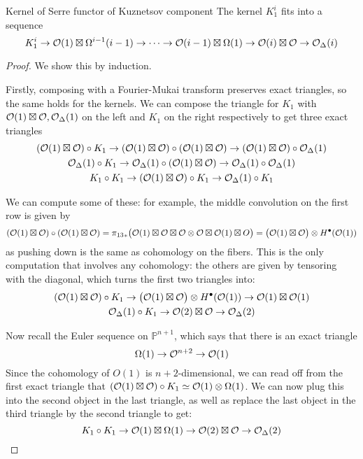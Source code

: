 \begin{proposition}{Kernel of Serre functor of Kuznetsov component}{}   
The kernel $K_1^i$ fits into a sequence $$K_1^i\rightarrow \mathcal{O}(1)\boxtimes \Omega^{i-1}(i-1)\rightarrow \dots \rightarrow \mathcal{O}(i-1)\boxtimes \Omega(1)\rightarrow \mathcal{O}(i)\boxtimes \mathcal{O} \rightarrow \mathcal{O}_\Delta(i)$$
\end{proposition}
\begin{proof}
    We show this by induction.
    
    Firstly, composing with a Fourier-Mukai transform preserves exact triangles, so the same holds for the kernels. We can compose the triangle for $K_1$ with $\mathcal{O}(1)\boxtimes \mathcal{O}, \mathcal{O}_\Delta(1)$ on the left and $K_1$ on the right respectively to get three exact triangles \begin{gather*}
        (\mathcal{O}(1)\boxtimes \mathcal{O}) \circ K_1 \rightarrow (\mathcal{O}(1)\boxtimes \mathcal{O})  \circ (\mathcal{O}(1)\boxtimes \mathcal{O}) \rightarrow (\mathcal{O}(1)\boxtimes \mathcal{O}) \circ \mathcal{O}_\Delta(1)\\
        \mathcal{O}_\Delta(1)\circ K_1 \rightarrow \mathcal{O}_\Delta(1) \circ (\mathcal{O}(1)\boxtimes \mathcal{O})  \rightarrow \mathcal{O}_\Delta(1) \circ \mathcal{O}_\Delta(1)\\
        K_1 \circ K_1  \rightarrow (\mathcal{O}(1)\boxtimes \mathcal{O})\circ K_1 \rightarrow \mathcal{O}_\Delta(1)\circ K_1
    \end{gather*}
    
    We can compute some of these: for example, the middle convolution on the first row is given by $$(\mathcal{O}(1)\boxtimes \mathcal{O})  \circ (\mathcal{O}(1)\boxtimes \mathcal{O}) ={\pi_{13}}_*\big(\mathcal{O}(1)\boxtimes \mathcal{O} \boxtimes \mathcal{O} \otimes \mathcal{O} \boxtimes \mathcal{O}(1) \boxtimes O\big)=\big(\mathcal{O}(1)\boxtimes \mathcal{O}\big) \otimes H^\bullet(\mathcal{O}(1))$$
    as pushing down is the same as cohomology on the fibers. This is the only computation that involves any cohomology: the others are given by tensoring with the diagonal, which turns the first two triangles into: \begin{gather*}
        (\mathcal{O}(1)\boxtimes \mathcal{O}) \circ K_1 \rightarrow \big(\mathcal{O}(1)\boxtimes \mathcal{O}\big) \otimes H^\bullet(\mathcal{O}(1)) \rightarrow \mathcal{O}(1)\boxtimes \mathcal{O}(1)\\
        \mathcal{O}_\Delta(1)\circ K_1 \rightarrow \mathcal{O}(2)\boxtimes \mathcal{O} \rightarrow \mathcal{O}_\Delta(2)
    \end{gather*}
    
    Now recall the Euler sequence on $\mathbb{P}^{n+1}$, which says that there is an exact triangle $$\Omega(1)\rightarrow \mathcal{O}^{n+2}\rightarrow \mathcal{O}(1)$$
    Since the cohomology of $O(1)$ is $n+2$-dimensional, we can read off from the first exact triangle that $ (\mathcal{O}(1)\boxtimes \mathcal{O}) \circ K_1\simeq \mathcal{O}(1) \otimes \Omega(1)$. We can now plug this into the second object in the last triangle, as well as replace the last object in the third triangle by the second triangle to get: $$K_1 \circ K_1 \rightarrow \mathcal{O}(1)\boxtimes \Omega(1)\rightarrow \mathcal{O}(2)\boxtimes \mathcal{O} \rightarrow \mathcal{O}_\Delta(2)$$
    

\end{proof}
